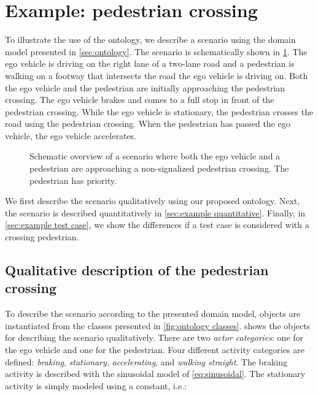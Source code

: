 \section{Example: pedestrian crossing}
\label{sec:example}

To illustrate the use of the ontology, we describe a scenario using the domain model presented in \cref{sec:ontology}. The scenario is schematically shown in \cref{fig:scenario overview}. The ego vehicle is driving on the right lane of a two-lane road and a pedestrian is walking on a footway that intersects the road the ego vehicle is driving on. Both the ego vehicle and the pedestrian are initially approaching the pedestrian crossing. The ego vehicle brakes and comes to a full stop in front of the pedestrian crossing. While the ego vehicle is stationary, the pedestrian crosses the road using the pedestrian crossing. When the pedestrian has passed the ego vehicle, the ego vehicle accelerates.

\setlength{\figurewidth}{0.5\linewidth}
\begin{figure}
	\centering
	
	\caption{Schematic overview of a scenario where both the ego vehicle and a pedestrian are approaching a non-signalized pedestrian crossing. The pedestrian has priority. 
	}
	\label{fig:scenario overview}
\end{figure}



We first describe the scenario qualitatively using our proposed ontology. Next, the scenario is described quantitatively in \cref{sec:example quantitative}. Finally, in \cref{sec:example test case}, we show the differences if a test case is considered with a crossing pedestrian.

\subsection{Qualitative description of the pedestrian crossing}
\label{sec:example qualitative}
To describe the scenario according to the presented domain model, objects are instantiated from the classes presented in \cref{fig:ontology classes}.  shows the objects for describing the scenario qualitatively. There are two \textit{actor categories}: one for the ego vehicle and one for the pedestrian. Four different activity categories are defined: \emph{braking}, \emph{stationary}, \emph{accelerating}, and \emph{walking straight}. The braking activity is described with the sinusoidal model of \cref{eq:sinusoidal}. The stationary activity is simply modeled using a constant, i.e.:

